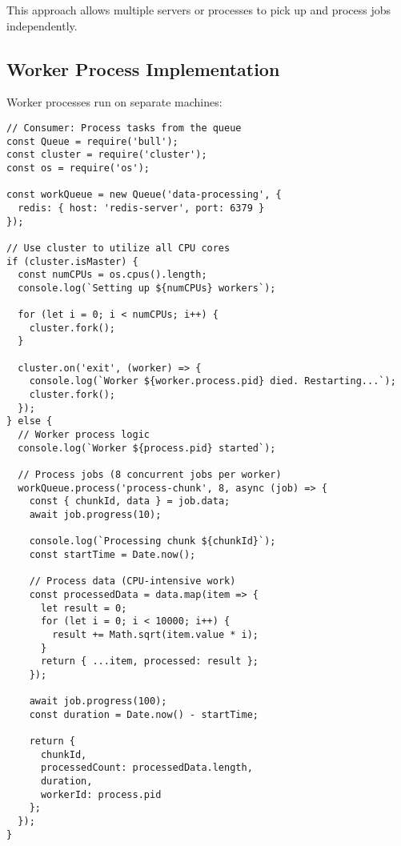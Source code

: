 \documentclass[12pt,letterpaper]{article}
\newenvironment{macterminal}{%
    \begin{mdframed}[
        linecolor=terminalFrame,
        backgroundcolor=terminalBg,
        roundcorner=5pt,
        skipabove=5pt,
        skipbelow=5pt,
        linewidth=1pt,
        innertopmargin=5pt,
        frametitle={%
            \tikz[baseline=(current bounding box.east), outer sep=0pt]{
                \fill[red!80!black] (0,0) circle (5pt);
                \fill[yellow!80!black] (0.7,0) circle (5pt);
                \fill[green!70!black] (1.4,0) circle (5pt);
            }
        },
        frametitlealignment=\raggedright,
        frametitleaboveskip=8pt,
        frametitlebelowskip=0pt,
    ]
}{%
    \end{mdframed}%
}
\begin{document}
This approach allows multiple servers or processes to pick up and process jobs independently.

\subsection{Worker Process Implementation}

Worker processes run on separate machines:

\begin{macterminal}
\begin{lstlisting}
// Consumer: Process tasks from the queue
const Queue = require('bull');
const cluster = require('cluster');
const os = require('os');

const workQueue = new Queue('data-processing', {
  redis: { host: 'redis-server', port: 6379 }
});

// Use cluster to utilize all CPU cores
if (cluster.isMaster) {
  const numCPUs = os.cpus().length;
  console.log(`Setting up ${numCPUs} workers`);
  
  for (let i = 0; i < numCPUs; i++) {
    cluster.fork();
  }
  
  cluster.on('exit', (worker) => {
    console.log(`Worker ${worker.process.pid} died. Restarting...`);
    cluster.fork();
  });
} else {
  // Worker process logic
  console.log(`Worker ${process.pid} started`);
  
  // Process jobs (8 concurrent jobs per worker)
  workQueue.process('process-chunk', 8, async (job) => {
    const { chunkId, data } = job.data;
    await job.progress(10);
    
    console.log(`Processing chunk ${chunkId}`);
    const startTime = Date.now();
    
    // Process data (CPU-intensive work)
    const processedData = data.map(item => {
      let result = 0;
      for (let i = 0; i < 10000; i++) {
        result += Math.sqrt(item.value * i);
      }
      return { ...item, processed: result };
    });
    
    await job.progress(100);
    const duration = Date.now() - startTime;
    
    return {
      chunkId,
      processedCount: processedData.length,
      duration,
      workerId: process.pid
    };
  });
}
\end{lstlisting}
\end{macterminal}
\end{document}
